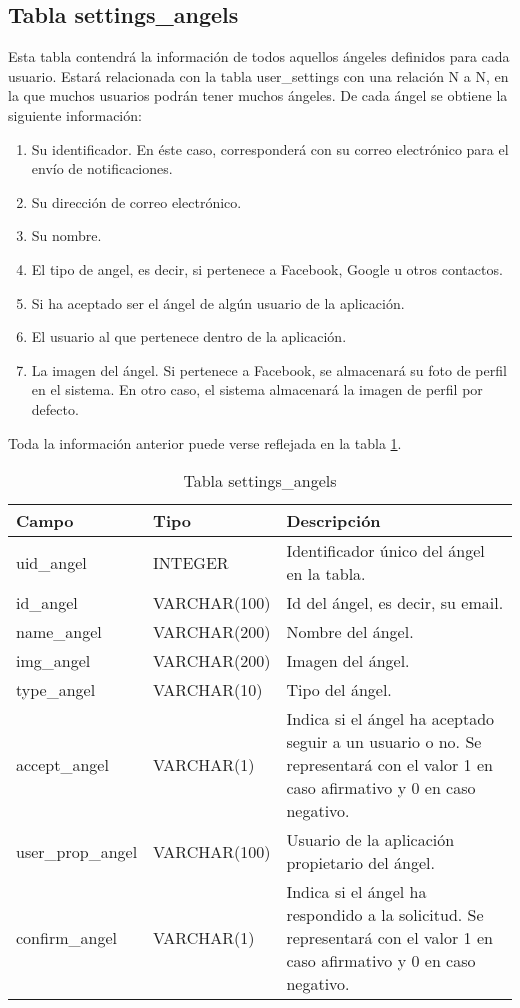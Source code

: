 \subsection{Tabla settings\_angels}
Esta tabla contendrá la información de todos aquellos ángeles definidos para cada usuario. Estará relacionada con la tabla user\_settings con una relación N a N, en la que muchos usuarios podrán tener muchos ángeles. De cada ángel se obtiene la siguiente información:
\begin{enumerate}
\item Su identificador. En éste caso, corresponderá con su correo electrónico para el envío de notificaciones.
\item Su dirección de correo electrónico.
\item Su nombre.
\item El tipo de angel, es decir, si pertenece a Facebook, Google u otros contactos.
\item Si ha aceptado ser el ángel de algún usuario de la aplicación.
\item El usuario al que pertenece dentro de la aplicación.
\item La imagen del ángel. Si pertenece a Facebook, se almacenará su foto de perfil en el sistema. En otro caso, el sistema almacenará la imagen de perfil por defecto.
\end{enumerate}
\bigskip
\par
Toda la información anterior puede verse reflejada en la tabla \ref{tabSettingsAngels}.
\begin{table}
\begin{center}

\begin{tabular}[c]{| l | l | p{60mm} |}\hline
\textbf{Campo}&\textbf{Tipo}&\textbf{Descripción} \\ \hline
uid\_angel & INTEGER & Identificador único del ángel en la tabla. \\ \hline
id\_angel & VARCHAR(100) & Id del ángel, es decir, su email. \\ \hline
name\_angel & VARCHAR(200) & Nombre del ángel. \\ \hline
img\_angel & VARCHAR(200) & Imagen del ángel. \\ \hline
type\_angel & VARCHAR(10) & Tipo del ángel. \\ \hline
accept\_angel & VARCHAR(1) & Indica si el ángel ha aceptado seguir a un usuario o no. Se representará con el valor 1 en caso afirmativo y 0 en caso negativo. \\ \hline
user\_prop\_angel & VARCHAR(100) & Usuario de la aplicación propietario del ángel. \\ \hline
confirm\_angel & VARCHAR(1) & Indica si el ángel ha respondido a la solicitud. Se representará con el valor 1 en caso afirmativo y 0 en caso negativo. \\ \hline
\end{tabular}
\end{center}
\caption{Tabla settings\_angels} \label{tabSettingsAngels}
\end{table}

